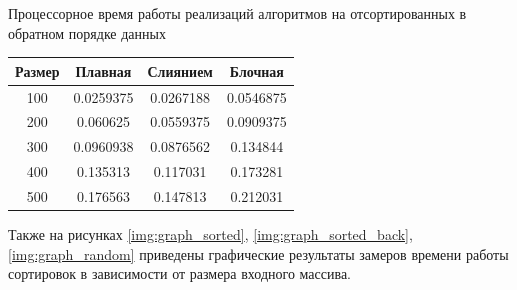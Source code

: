 	\begin{center}
		\begin{threeparttable}
			\caption{Процессорное время работы реализаций алгоритмов на отсортированных в обратном порядке данных}
			\label{tbl:random}
			\begin{tabular}{|c|c|c|c|}
			\hline
			Размер & Плавная &  Слиянием &  Блочная \\
			\hline
			100 & 0.0259375 & 0.0267188 &  0.0546875\\ 
			\hline
			200 & 0.060625 & 0.0559375 & 0.0909375 \\ 
			\hline
			300 & 0.0960938 & 0.0876562 & 0.134844 \\ 
			\hline
			400 & 0.135313 & 0.117031 & 0.173281 \\ 
			\hline
			500 & 0.176563 & 0.147813 & 0.212031\\ 
			\hline
			\end{tabular}		
		\end{threeparttable}
	\end{center}


Также на рисунках \ref{img:graph_sorted}, \ref{img:graph_sorted_back}, \ref{img:graph_random} приведены графические результаты замеров времени работы сортировок в зависимости от размера входного массива.


